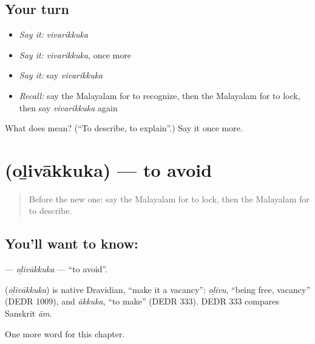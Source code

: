 \subsection*{Your turn}
\begin{itemize}
\raggedright
  \item \emph{Say it:} \emph{vivarikkuka}
  \item \emph{Say it:} \emph{vivarikkuka}, once more
  \item \emph{Say it:} say \emph{vivarikkuka}
  \item \emph{Recall:} say the Malayalam for to recognize, then the Malayalam for to lock, then say \emph{vivarikkuka} again
\end{itemize}

\begin{tcolorbox}[breakable,colback=teal!4,colframe=teal!35!black,title={Before you move on}]
What does  mean? (\textquotedblleft{}To describe, to explain\textquotedblright{}.) Say it once more.
\end{tcolorbox}
\section[\texorpdfstring{\ml{ഒഴിവാക്കുക} (oḻivākkuka)}{ഒഴിവാക്കുക (oḻivākkuka)}]{ (oḻivākkuka) — to avoid}

\label{lesson:ML-C309-olivakkuka}



\begin{quote}
Before the new one: say the Malayalam for to lock, then the Malayalam for to describe.
\end{quote}

\subsection*{You'll want to know: }
\textbf{} — \emph{oḻivākkuka} — \textquotedblleft{}to avoid\textquotedblright{}.

\begin{cousinweb}
\textbf{} (\emph{oḻivākkuka}) is native Dravidian, \textquotedblleft{}make it a vacancy\textquotedblright{}: \emph{oḻivu}, \textquotedblleft{}being free, vacancy\textquotedblright{} (DEDR 1009), and \emph{ākkuka}, \textquotedblleft{}to make\textquotedblright{} (DEDR 333). DEDR 333 compares Sanskrit \emph{ām}.
\end{cousinweb}

\begin{grammarlens}[title={What you've built}]
One more word for this chapter.
\end{grammarlens}

